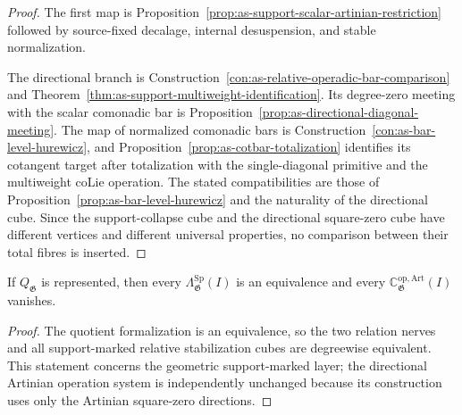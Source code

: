 \begin{proof}
The first map is
Proposition~\ref{prop:as-support-scalar-artinian-restriction} followed by
source-fixed decalage, internal desuspension, and stable normalization.

The directional branch is
Construction~\ref{con:as-relative-operadic-bar-comparison} and
Theorem~\ref{thm:as-support-multiweight-identification}.  Its degree-zero
meeting with the scalar comonadic bar is
Proposition~\ref{prop:as-directional-diagonal-meeting}.  The map of normalized
comonadic bars is
Construction~\ref{con:as-bar-level-hurewicz}, and
Proposition~\ref{prop:as-cotbar-totalization} identifies its cotangent target
after totalization with the single-diagonal primitive and the multiweight
coLie operation.  The stated compatibilities are those of
Proposition~\ref{prop:as-bar-level-hurewicz} and the naturality of the
directional cube.  Since the support-collapse cube and the directional
square-zero cube have different vertices and different universal properties,
no comparison between their total fibres is inserted.
\end{proof}

\begin{corollary}
\label{cor:as-represented-raw-formalized-operations}
If $Q_{\mathfrak G}$ is represented, then every
$\Lambda_{\mathfrak G}^{\mathrm{Sp}}(I)$ is an equivalence and every
$\mathbb C_{\mathfrak G}^{\mathrm{op,Art}}(I)$ vanishes.
\end{corollary}

\begin{proof}
The quotient formalization is an equivalence, so the two relation nerves and
all support-marked relative stabilization cubes are degreewise equivalent.
This statement concerns the geometric support-marked layer; the directional
Artinian operation system is independently unchanged because its construction
uses only the Artinian square-zero directions.
\end{proof}

